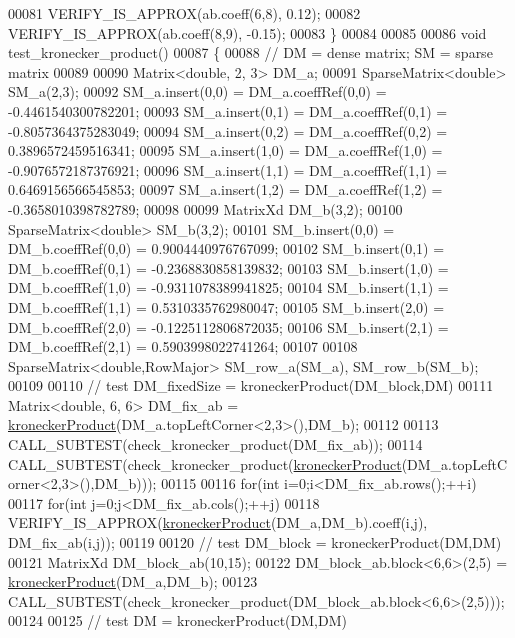 \begin{DoxyCode}
00081   VERIFY\_IS\_APPROX(ab.coeff(6,8),  0.12);
00082   VERIFY\_IS\_APPROX(ab.coeff(8,9), -0.15);
00083 \}
00084 
00085 
00086 \textcolor{keywordtype}{void} test\_kronecker\_product()
00087 \{
00088   \textcolor{comment}{// DM = dense matrix; SM = sparse matrix}
00089 
00090   Matrix<double, 2, 3> DM\_a;
00091   SparseMatrix<double> SM\_a(2,3);
00092   SM\_a.insert(0,0) = DM\_a.coeffRef(0,0) = -0.4461540300782201;
00093   SM\_a.insert(0,1) = DM\_a.coeffRef(0,1) = -0.8057364375283049;
00094   SM\_a.insert(0,2) = DM\_a.coeffRef(0,2) =  0.3896572459516341;
00095   SM\_a.insert(1,0) = DM\_a.coeffRef(1,0) = -0.9076572187376921;
00096   SM\_a.insert(1,1) = DM\_a.coeffRef(1,1) =  0.6469156566545853;
00097   SM\_a.insert(1,2) = DM\_a.coeffRef(1,2) = -0.3658010398782789;
00098  
00099   MatrixXd             DM\_b(3,2);
00100   SparseMatrix<double> SM\_b(3,2);
00101   SM\_b.insert(0,0) = DM\_b.coeffRef(0,0) =  0.9004440976767099;
00102   SM\_b.insert(0,1) = DM\_b.coeffRef(0,1) = -0.2368830858139832;
00103   SM\_b.insert(1,0) = DM\_b.coeffRef(1,0) = -0.9311078389941825;
00104   SM\_b.insert(1,1) = DM\_b.coeffRef(1,1) =  0.5310335762980047;
00105   SM\_b.insert(2,0) = DM\_b.coeffRef(2,0) = -0.1225112806872035;
00106   SM\_b.insert(2,1) = DM\_b.coeffRef(2,1) =  0.5903998022741264;
00107 
00108   SparseMatrix<double,RowMajor> SM\_row\_a(SM\_a), SM\_row\_b(SM\_b);
00109 
00110   \textcolor{comment}{// test DM\_fixedSize = kroneckerProduct(DM\_block,DM)}
00111   Matrix<double, 6, 6> DM\_fix\_ab = \hyperlink{namespace_eigen_aedd4b7cd1e324ed0769cac2701f4d050}{kroneckerProduct}(DM\_a.topLeftCorner<2,3>(),DM\_b);
00112 
00113   CALL\_SUBTEST(check\_kronecker\_product(DM\_fix\_ab));
00114   CALL\_SUBTEST(check\_kronecker\_product(\hyperlink{namespace_eigen_aedd4b7cd1e324ed0769cac2701f4d050}{kroneckerProduct}(DM\_a.topLeftCorner<2,3>(),DM\_b)));
00115 
00116   \textcolor{keywordflow}{for}(\textcolor{keywordtype}{int} i=0;i<DM\_fix\_ab.rows();++i)
00117     \textcolor{keywordflow}{for}(\textcolor{keywordtype}{int} j=0;j<DM\_fix\_ab.cols();++j)
00118        VERIFY\_IS\_APPROX(\hyperlink{namespace_eigen_aedd4b7cd1e324ed0769cac2701f4d050}{kroneckerProduct}(DM\_a,DM\_b).coeff(i,j), DM\_fix\_ab(i,j));
00119 
00120   \textcolor{comment}{// test DM\_block = kroneckerProduct(DM,DM)}
00121   MatrixXd DM\_block\_ab(10,15);
00122   DM\_block\_ab.block<6,6>(2,5) = \hyperlink{namespace_eigen_aedd4b7cd1e324ed0769cac2701f4d050}{kroneckerProduct}(DM\_a,DM\_b);
00123   CALL\_SUBTEST(check\_kronecker\_product(DM\_block\_ab.block<6,6>(2,5)));
00124 
00125   \textcolor{comment}{// test DM = kroneckerProduct(DM,DM)}

\end{DoxyCode}

